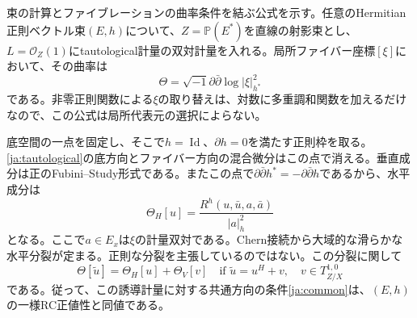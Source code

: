 \documentclass[12pt]{amsart}
\theoremstyle{definition}
\theoremstyle{remark}
\numberwithin{equation}{section}
\DeclareMathOperator{\Id}{Id}
\newcommand{\Pp}{\mathbb P}
\newcommand{\ddc}{\sqrt{-1}\partial\bar\partial}
\newcommand{\jref}[1]{\eqref{ja:#1}}
\begin{document}
束の計算とファイブレーションの曲率条件を結ぶ公式を示す。任意のHermitian正則ベクトル束$(E,h)$について、$Z=\Pp(E^*)$を直線の射影束とし、$L=\mathcal O_Z(1)$にtautological計量の双対計量を入れる。局所ファイバー座標$[\xi]$において、その曲率は
\begin{equation}\label{ja:tautological}
\Theta=\ddc\log|\xi|_{h^*}^2
\end{equation}
である。非零正則関数による$\xi$の取り替えは、対数に多重調和関数を加えるだけなので、この公式は局所代表元の選択によらない。

底空間の一点を固定し、そこで$h=\Id$、$\partial h=0$を満たす正則枠を取る。\jref{tautological}の底方向とファイバー方向の混合微分はこの点で消える。垂直成分は正のFubini--Study形式である。またこの点で$\partial\bar\partial h^*=-\partial\bar\partial h$であるから、水平成分は
\begin{equation}\label{ja:horizontal}
\Theta_H[u]=\frac{R^h(u,\bar u,a,\bar a)}{|a|_h^2}
\end{equation}
となる。ここで$a\in E_x$は$\xi$の計量双対である。Chern接続から大域的な滑らかな水平分裂が定まる。正則な分裂を主張しているのではない。この分裂に関して
\begin{equation}\label{ja:lifts}
\Theta[\widetilde u]=\Theta_H[u]+\Theta_V[v]
\quad\text{if }\widetilde u=u^H+v,\quad v\in T^{1,0}_{Z/X}
\end{equation}
である。従って、この誘導計量に対する共通方向の条件\jref{common}は、$(E,h)$の一様RC正値性と同値である。
\end{document}
